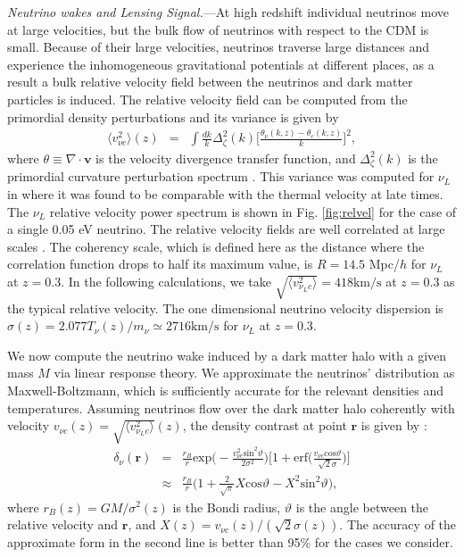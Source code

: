 \documentclass[aps,prl,twocolumn,showpacs,superscriptaddress,groupedaddress,nofootinbib]{revtex4}  %
\newcommand{\mr}{\mathrm}
\begin{document}
{\it Neutrino wakes and Lensing Signal.}---At 
high redshift individual neutrinos move at
large velocities, but the bulk flow of neutrinos with respect to 
the CDM is small.  Because of their large velocities, 
neutrinos traverse large distances
and experience the inhomogeneous gravitational potentials at different places,
as a result a bulk relative velocity field between the neutrinos and 
dark matter particles is induced.
The relative velocity field can be computed from the primordial density
perturbations and its variance is given by 
\begin{eqnarray}
\label{v_nuc}
\langle v^2_{\nu c}\rangle(z)
&=& \int \frac{dk}{k}\Delta^2_{\zeta}(k)\bigg[ \frac{\theta_\nu (k, z) - \theta_c (k, z)}{k} \bigg]^2, 
\end{eqnarray}
where $\theta\equiv\nabla\cdot{\bm v}$ is the velocity divergence
transfer function, and $\Delta^2_\zeta(k)$ is the primordial curvature
perturbation spectrum \cite{Zhu:2013}.
This variance was computed for $\nu_L$ in \cite{Zhu:2013} where it was
found to be comparable with the thermal velocity at late times. The $\nu_L$
relative velocity power spectrum is shown in Fig. \ref{fig:relvel} for the
case of a single 0.05 eV neutrino.
The relative velocity fields are well correlated at large 
scales \cite{Zhu:2013}. The coherency scale, which is defined here as the 
distance where the correlation function drops to half its maximum value,
is $R=14.5$ Mpc/$h$ for $\nu_L$ at $z=0.3$. 
In the following calculations, 
we take $\sqrt{\langle v^2_{\nu_L c}\rangle}=418\mr{km/s}$ at $z=0.3$ 
as the typical relative velocity. The one dimensional neutrino velocity 
dispersion is $\sigma(z)=2.077T_{\nu}(z)/m_\nu\simeq2716\mr{km/s}$ 
for $\nu_L$ at $z=0.3$.

We now compute the neutrino wake induced by a dark matter halo with a
given mass $M$ via linear response theory. 
We approximate the neutrinos' distribution as Maxwell-Boltzmann, 
which is sufficiently accurate for the relevant densities and temperatures.
Assuming neutrinos
flow over the dark matter halo coherently with velocity $v_{\nu c}(z)
=\sqrt{\langle v^2_{\nu_L c}\rangle}(z)$, the density contrast at point
$\bm{r}$ is given by \cite{Binney:2008}:
\begin{eqnarray}
  \label{delta_nu}
  \delta_\nu(\bm{r})
  &=&\frac{r_B}{r}
  \mr{exp}\bigg(-\frac{v_{\nu c}^2\mr{sin}^2\vartheta}{2\sigma^2}\bigg)
  \bigg[1+\mr{erf}\bigg(\frac{v_{\nu
      c}\mr{cos}\vartheta}{\sqrt{2}\sigma}\bigg)\bigg] \nonumber \\
  &\approx&\frac{r_B}{r}
  \bigg(1+\frac{2}{\sqrt{\pi}}X\mr{cos}\vartheta-X^2\mr{sin}^2\vartheta\bigg),
\end{eqnarray}
where $r_B(z) = GM/\sigma^2(z)$ is the Bondi radius, $\vartheta$ is the
angle between the relative velocity and $\bm{r}$, and $X(z)=v_{\nu
  c}(z)/(\sqrt{2}\sigma(z))$. The accuracy of the approximate form in 
the second line is better than 95\% for the cases we consider.
\end{document}
